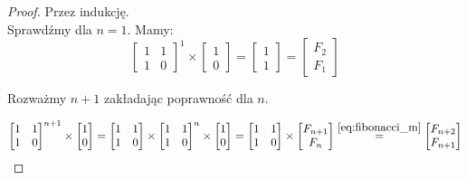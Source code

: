 \begin{proof}{Przez indukcję.}\\
Sprawdźmy dla $n = 1$. Mamy:
\begin{equation}
	\begin{bmatrix}1 & 1\\1 & 0\end{bmatrix}^1 \times \begin{bmatrix}1 \\ 0\end{bmatrix}
	= \begin{bmatrix}1 \\ 1\end{bmatrix} = \begin{bmatrix}F_2 \\ F_1\end{bmatrix}
\end{equation}

Rozważmy $n + 1$ zakładając poprawność dla $n$.

\begin{equation}
	\begin{bmatrix}1 & 1\\1 & 0\end{bmatrix}^{n + 1} \times \begin{bmatrix}1 \\ 0\end{bmatrix}
	= \begin{bmatrix}1 & 1\\1 & 0\end{bmatrix} \times \begin{bmatrix}1 & 1\\1 & 0\end{bmatrix}^{n} \times \begin{bmatrix}1 \\ 0\end{bmatrix}
	= \begin{bmatrix}1 & 1\\1 & 0\end{bmatrix} \times \begin{bmatrix}F_{n+1} \\ F_{n}\end{bmatrix}
	\stackrel{\ref{eq:fibonacci_m}}{=} \begin{bmatrix}F_{n + 2} \\ F_{n + 1}\end{bmatrix}
\end{equation}
\end{proof}

